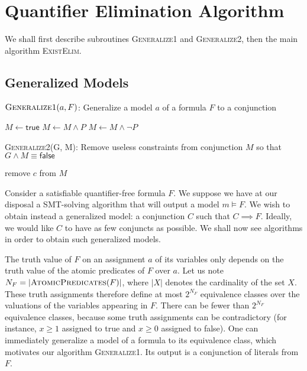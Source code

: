 \section{Quantifier Elimination Algorithm}
\label{part:algorithm}
We shall first describe subroutines \textsc{Generalize1} and \textsc{Generalize2}, then the main algorithm \textsc{ExistElim}.

\subsection{Generalized Models}

\begin{algorithm}
\caption{$\textsc{Generalize1}(a, F)$: Generalize a model $a$ of a formula $F$ to a conjunction}

\begin{algorithmic}
\STATE $M \gets \textsf{true}$
    \STATE $M \gets M \wedge P$
  \ELSE
    \STATE $M \gets M \wedge \neg P$
  \ENDIF
\ENDFOR
{}
\end{algorithmic}
\end{algorithm}


\begin{algorithm}
\caption{\textsc{Generalize2}(G, M): Remove useless constraints from conjunction $M$ so that $G \wedge M \equiv \textsf{false}$}
\begin{algorithmic}
     \STATE remove $c$ from $M$
  \ENDIF
\ENDFOR
{}
\end{algorithmic}
\end{algorithm}

Consider a satisfiable quantifier-free formula $F$. We suppose we have at our disposal a SMT-solving algorithm that will output a model $m \models F$. We wish to obtain instead a generalized model: a conjunction $C$ such that $C \implies F$. Ideally, we would like $C$ to have as few conjuncts as possible. We shall now see algorithms in order to obtain such generalized models.

The truth value of $F$ on an assignment $a$ of its variables only depends on the truth value of the atomic predicates of $F$ over $a$. Let us note $N_F = |\textsc{AtomicPredicates}(F)|$, where $|X|$ denotes the cardinality of the set $X$. These truth assignments therefore define at most $2^{N_F}$ equivalence classes over the valuations of the variables appearing in $F$. There can be fewer than $2^{N_F}$ equivalence classes, because some truth assignments can be contradictory (for instance, $x \geq 1$ assigned to \textsf{true} and $x \geq 0$ assigned to \textsf{false}). One can immediately generalize a model of a formula to its equivalence class, which motivates our algorithm \textsc{Generalize1}. Its output is a conjunction of literals from $F$.

